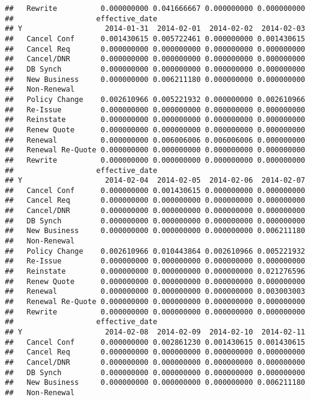 \documentclass[]{article}
\begin{document}
\begin{verbatim}
##   Rewrite          0.000000000 0.041666667 0.000000000 0.000000000
##                   effective_date
## Y                   2014-01-31  2014-02-01  2014-02-02  2014-02-03
##   Cancel Conf      0.001430615 0.005722461 0.000000000 0.001430615
##   Cancel Req       0.000000000 0.000000000 0.000000000 0.000000000
##   Cancel/DNR       0.000000000 0.000000000 0.000000000 0.000000000
##   DB Synch         0.000000000 0.000000000 0.000000000 0.000000000
##   New Business     0.000000000 0.006211180 0.000000000 0.000000000
##   Non-Renewal                                                     
##   Policy Change    0.002610966 0.005221932 0.000000000 0.002610966
##   Re-Issue         0.000000000 0.000000000 0.000000000 0.000000000
##   Reinstate        0.000000000 0.000000000 0.000000000 0.000000000
##   Renew Quote      0.000000000 0.000000000 0.000000000 0.000000000
##   Renewal          0.000000000 0.006006006 0.006006006 0.000000000
##   Renewal Re-Quote 0.000000000 0.000000000 0.000000000 0.000000000
##   Rewrite          0.000000000 0.000000000 0.000000000 0.000000000
##                   effective_date
## Y                   2014-02-04  2014-02-05  2014-02-06  2014-02-07
##   Cancel Conf      0.000000000 0.001430615 0.000000000 0.000000000
##   Cancel Req       0.000000000 0.000000000 0.000000000 0.000000000
##   Cancel/DNR       0.000000000 0.000000000 0.000000000 0.000000000
##   DB Synch         0.000000000 0.000000000 0.000000000 0.000000000
##   New Business     0.000000000 0.000000000 0.000000000 0.006211180
##   Non-Renewal                                                     
##   Policy Change    0.002610966 0.010443864 0.002610966 0.005221932
##   Re-Issue         0.000000000 0.000000000 0.000000000 0.000000000
##   Reinstate        0.000000000 0.000000000 0.000000000 0.021276596
##   Renew Quote      0.000000000 0.000000000 0.000000000 0.000000000
##   Renewal          0.000000000 0.000000000 0.000000000 0.003003003
##   Renewal Re-Quote 0.000000000 0.000000000 0.000000000 0.000000000
##   Rewrite          0.000000000 0.000000000 0.000000000 0.000000000
##                   effective_date
## Y                   2014-02-08  2014-02-09  2014-02-10  2014-02-11
##   Cancel Conf      0.000000000 0.002861230 0.001430615 0.001430615
##   Cancel Req       0.000000000 0.000000000 0.000000000 0.000000000
##   Cancel/DNR       0.000000000 0.000000000 0.000000000 0.000000000
##   DB Synch         0.000000000 0.000000000 0.000000000 0.000000000
##   New Business     0.000000000 0.000000000 0.000000000 0.006211180
##   Non-Renewal                                                     

\end{verbatim}
\end{document}
